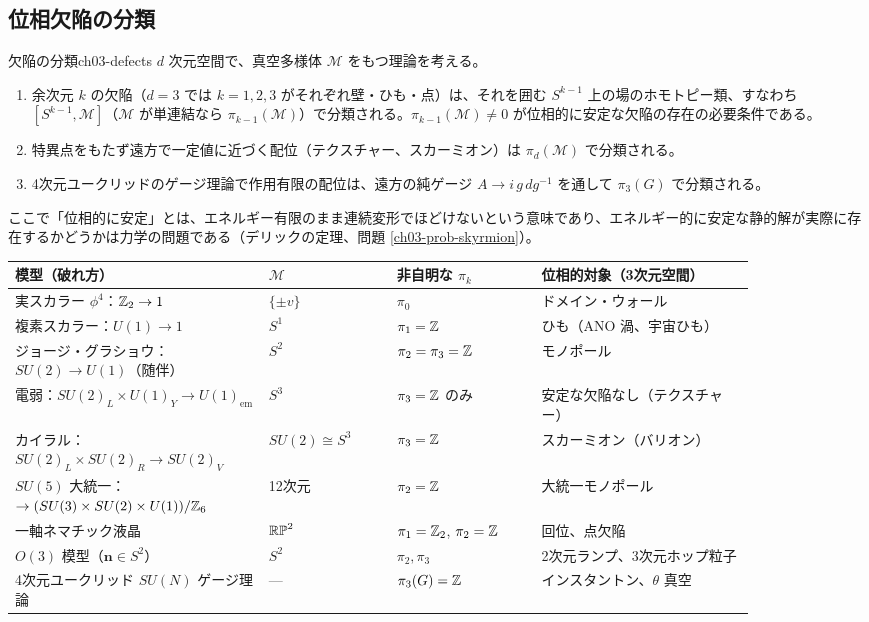\subsection{位相欠陥の分類}

\begin{mythm}{欠陥の分類}{ch03-defects}
$d$ 次元空間で、真空多様体 $\mathcal M$ をもつ理論を考える。
\begin{enumerate}
\item 余次元 $k$ の欠陥（$d=3$ では $k=1,2,3$ がそれぞれ壁・ひも・点）は、それを囲む $S^{k-1}$ 上の場のホモトピー類、すなわち $[S^{k-1},\mathcal M]$（$\mathcal M$ が単連結なら $\pi_{k-1}(\mathcal M)$）で分類される。$\pi_{k-1}(\mathcal M)\neq0$ が位相的に安定な欠陥の存在の必要条件である。
\item 特異点をもたず遠方で一定値に近づく配位（テクスチャー、スカーミオン）は $\pi_d(\mathcal M)$ で分類される。
\item 4次元ユークリッドのゲージ理論で作用有限の配位は、遠方の純ゲージ $A\to i\,g\,dg^{-1}$ を通して $\pi_3(G)$ で分類される。
\end{enumerate}
\end{mythm}
ここで「位相的に安定」とは、エネルギー有限のまま連続変形でほどけないという意味であり、エネルギー的に安定な静的解が実際に存在するかどうかは力学の問題である（デリックの定理、問題 \ref{ch03-prob-skyrmion}）。

\begin{physbox}[：対称性の破れと位相欠陥]
\begin{center}
\renewcommand{\arraystretch}{1.2}\small
\begin{tabular}{p{0.29\linewidth}p{0.15\linewidth}p{0.17\linewidth}p{0.25\linewidth}}
模型（破れ方） & $\mathcal M$ & 非自明な $\pi_k$ & 位相的対象（3次元空間）\\ \hline
実スカラー $\phi^4$：$\mathbb{Z}_2\to1$ & $\{\pm v\}$ & $\pi_0$ & ドメイン・ウォール\\
複素スカラー：$U(1)\to1$ & $S^1$ & $\pi_1=\mathbb{Z}$ & ひも（ANO 渦、宇宙ひも）\\
ジョージ・グラショウ：$SU(2)\to U(1)$（随伴） & $S^2$ & $\pi_2=\pi_3=\mathbb{Z}$ & モノポール\\
電弱：$SU(2)_L\times U(1)_Y\to U(1)_{\mathrm{em}}$ & $S^3$ & $\pi_3=\mathbb{Z}$ のみ & 安定な欠陥なし（テクスチャー）\\
カイラル：$SU(2)_L\times SU(2)_R\to SU(2)_V$ & $SU(2)\cong S^3$ & $\pi_3=\mathbb{Z}$ & スカーミオン（バリオン）\\
$SU(5)$ 大統一：$\to(SU(3)\times SU(2)\times U(1))/\mathbb{Z}_6$ & 12次元 & $\pi_2=\mathbb{Z}$ & 大統一モノポール\\
一軸ネマチック液晶 & $\mathbb{RP}^2$ & $\pi_1=\mathbb{Z}_2$, $\pi_2=\mathbb{Z}$ & 回位、点欠陥\\
$O(3)$ 模型（$\bm n\in S^2$） & $S^2$ & $\pi_2,\pi_3$ & 2次元ランプ、3次元ホップ粒子\\
4次元ユークリッド $SU(N)$ ゲージ理論 & --- & $\pi_3(G)=\mathbb{Z}$ & インスタントン、$\theta$ 真空
\end{tabular}
\end{center}
\end{physbox}


